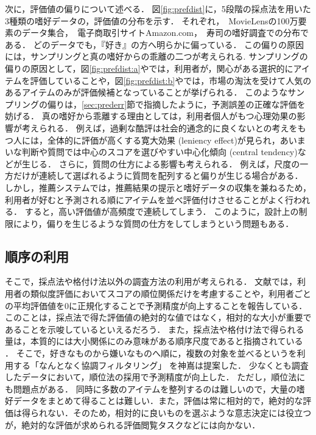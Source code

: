 次に，評価値の偏りについて述べる．
図\ref{fig:prefdist}に，5段階の採点法を用いた3種類の嗜好データの，評価値の分布を示す．
それぞれ，~MovieLensの100万要素のデータ集合\cite{misc:129}，~電子商取引サイトAmazon.com\cite{misc:007}，~寿司の嗜好調査\cite{misc:140,epublist:064}での分布である．
どのデータでも，『好き』の方へ明らかに偏っている．
この偏りの原因には，サンプリングと真の嗜好からの乖離の二つが考えられる.
サンプリングの偏りの原因として，図\ref{fig:prefdist:a}やでは，利用者が，関心がある選択的にアイテムを評価していることや，図\ref{fig:prefdist:b}やでは，市場の淘汰を受けて人気のあるアイテムのみが評価候補となっていることが挙げられる．
このようなサンプリングの偏りは，\ref{sec:prederr}節で指摘したように，予測誤差の正確な評価を妨げる．
真の嗜好から乖離する理由としては，利用者個人がもつ心理効果の影響が考えられる．
例えば，過剰な酷評は社会的通念的に良くないとの考えをもつ人には，全体的に評価が高くする寛大効果 (leniency effect)が見られ，あいまいな判断や質問では中心のスコアを選びやすい中心化傾向 (central tendency)などが生じる\cite{jb:026:00}．
さらに，質問の仕方による影響も考えられる．
例えば，尺度の一方だけが連続して選ばれるように質問を配列すると偏りが生じる場合がある\cite{jb:022:00}．
しかし，推薦システムでは，推薦結果の提示と嗜好データの収集を兼ねるため，利用者が好むと予測される順にアイテムを並べ評価付けさせることがよく行われる．
すると，高い評価値が高頻度で連続してしまう．
このように，設計上の制限により，偏りを生じるような質問の仕方をしてしまうという問題もある．

\subsection{順序の利用}

そこで，採点法や格付け法以外の調査方法の利用が考えられる．
文献\cite{sigir:99:02}では，利用者の類似度評価においてスコアの順位関係だけを考慮することや，利用者ごとの平均評価値を0に正規化することで予測精度が向上することを報告している．
このことは，採点法で得た評価値の絶対的な値ではなく，相対的な大小が重要であることを示唆しているといえるだろう．
また，採点法や格付け法で得られる量は，本質的には大小関係にのみ意味がある順序尺度\cite{eb:036:00,jj:015}であると指摘されている
\cite{jb:022:00}．
そこで，好きなものから嫌いなものへ順に，複数の対象を並べるというを利用する「なんとなく協調フィルタリング」
\cite{epublist:039,epublist:064}を神嶌は提案した．
少なくとも調査したデータにおいて，順位法の採用で予測精度が向上した．
ただし，順位法にも問題点がある．
同時に多数のアイテムを整列するのは難しいので，大量の嗜好データをまとめて得ることは難しい．また，評価は常に相対的で，絶対的な評価は得られない．そのため，相対的に良いものを選ぶような意志決定には役立つが，絶対的な評価が求められる評価閲覧タスクなどには向かない．

